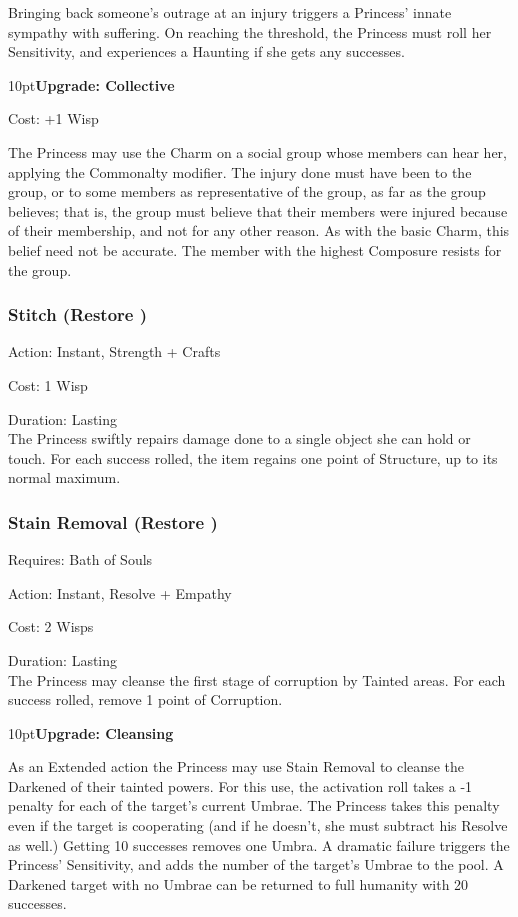Bringing back someone's outrage at an injury triggers a Princess' innate sympathy with suffering. On reaching the threshold, the Princess must roll her Sensitivity, and experiences a Haunting if she gets any successes.
\begin{myindentpar}{10pt}\textbf{Upgrade: Collective}

\noindent Cost: +1 Wisp

The Princess may use the Charm on a social group whose members can hear her, applying the Commonalty modifier. The injury done must have been to the group, or to some members as representative of the group, as far as the group believes; that is, the group must believe that their members were injured because of their membership, and not for any other reason. As with the basic Charm, this belief need not be accurate. The member with the highest Composure resists for the group.\end{myindentpar}
\subsubsection*{Stitch (Restore \textbullet\textbullet\textbullet)}

\noindent Action: Instant, Strength + Crafts

\noindent Cost: 1 Wisp

\noindent Duration: Lasting \\

\noindent The Princess swiftly repairs damage done to a single object she can hold or touch. For each success rolled, the item regains one point of Structure, up to its normal maximum.

\subsubsection*{Stain Removal (Restore \textbullet\textbullet\textbullet)}

\noindent Requires: Bath of Souls

\noindent Action: Instant, Resolve + Empathy

\noindent Cost: 2 Wisps

\noindent Duration: Lasting \\

\noindent The Princess may cleanse the first stage of corruption by Tainted areas. For each success rolled, remove 1 point of Corruption.

\begin{myindentpar}{10pt}\textbf{Upgrade: Cleansing}

As an Extended action the Princess may use Stain Removal to cleanse the Darkened of their tainted powers. For this use, the activation roll takes a -1 penalty for each of the target's current Umbrae. The Princess takes this penalty even if the target is cooperating (and if he doesn't, she must subtract his Resolve as well.) Getting 10 successes removes one Umbra. A dramatic failure triggers the Princess' Sensitivity, and adds the number of the target's Umbrae to the pool. A Darkened target with no Umbrae can be returned to full humanity with 20 successes.\end{myindentpar}

